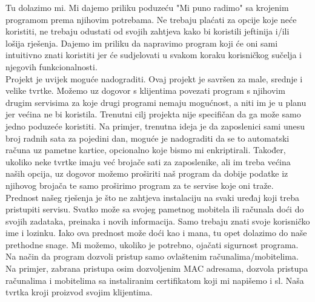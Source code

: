 		Tu dolazimo mi. Mi dajemo priliku poduzeću "Mi puno radimo" sa krojenim programom prema njihovim potrebama. Ne trebaju plaćati za opcije koje neće koristiti, ne trebaju odustati od svojih zahtjeva kako bi koristili jeftinija i/ili lošija rješenja. Dajemo im priliku da napravimo program koji će oni sami intuitivno znati koristiti jer će sudjelovati u svakom koraku korisničkog sučelja i njegovih funkcionalnosti.\\ 
		
		Projekt je uvijek moguće nadograditi. Ovaj projekt je savršen za male, srednje i velike tvrtke. Možemo uz dogovor s klijentima povezati program s njihovim drugim servisima za koje drugi programi nemaju mogućnost, a niti im je u planu jer većina ne bi koristila. Trenutni cilj projekta nije specifičan da ga može samo jedno poduzeće koristiti. Na primjer, trenutna ideja je da zaposlenici sami unesu broj radnih sata za pojedini dan, moguće je nadograditi da se to automatski računa uz pametne kartice, opcionalno koje bismo mi enkriptirali. Također, ukoliko neke tvrtke imaju već brojače sati za zaposlenike, ali im treba većina naših opcija, uz dogovor možemo proširiti naš program da dobije podatke iz njihovog brojača te samo proširimo program za te servise koje oni traže.\\
		
		Prednost našeg rješenja je što ne zahtjeva instalaciju na svaki uređaj koji treba pristupiti servisu. Svatko može sa svojeg pametnog mobitela ili računala doći do svojih zadataka, preinaka i novih informacija. Samo trebaju znati svoje korisničko ime i lozinku. Iako ova prednost može doći kao i mana, tu opet dolazimo do naše prethodne snage. Mi možemo, ukoliko je potrebno, ojačati sigurnost programa. Na način da program dozvoli pristup samo ovlaštenim računalima/mobitelima. Na primjer, zabrana pristupa osim dozvoljenim MAC adresama, dozvola pristupa računalima i mobitelima sa instaliranim certifikatom koji mi napišemo i sl. Naša tvrtka kroji proizvod svojim klijentima.
		
